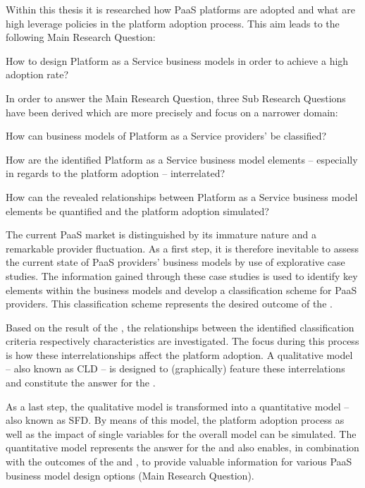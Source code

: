 Within this thesis it is researched how \ac{PaaS} platforms are adopted and what are high leverage policies in the platform adoption process. This aim leads to the following Main Research Question:

\begin{MRQ}\label{mrq}
How to design Platform as a Service business models in order to achieve a high adoption rate?
\end{MRQ}

In order to answer the Main Research Question, three Sub Research Questions have been derived which are more precisely and focus on a narrower domain:

\begin{SRQ}\label{srq1}
How can business models of Platform as a Service providers' be classified?
\end{SRQ}

\begin{SRQ}\label{srq2}
How are the identified Platform as a Service business model elements -- especially in regards to the platform adoption -- interrelated?
\end{SRQ}

\begin{SRQ}\label{srq3}
How can the revealed relationships between Platform as a Service business model elements be quantified and the platform adoption simulated?
\end{SRQ}

The current \ac{PaaS} market is distinguished by its immature nature and a remarkable provider fluctuation. As a first step, it is therefore inevitable to assess the current state of \ac{PaaS} providers' business models by use of explorative case studies. The information gained through these case studies is used to identify key elements within the business models and develop a classification scheme for \ac{PaaS} providers. This classification scheme represents the desired outcome of the . 

Based on the result of the , the relationships between the identified classification criteria respectively characteristics are investigated. The focus during this process is how these interrelationships affect the platform adoption. A qualitative model -- also known as \acf{CLD} -- is designed to (graphically) feature these interrelations and constitute the answer for the .

As a last step, the qualitative model is transformed into a quantitative model -- also known as \acf{SFD}. By means of this model, the platform adoption process as well as the impact of single variables for the overall model can be simulated. The quantitative model represents the answer for the  and also enables, in combination with the outcomes of the  and , to provide valuable information for various \ac{PaaS} business model design options (Main Research Question).
	
